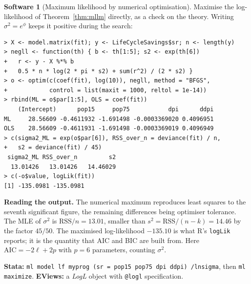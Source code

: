 \documentclass[11pt,a4paper]{article}
\numberwithin{equation}{section}
\theoremstyle{definition}
\newtheorem{software}[thm]{Software}
\begin{document}
\begin{software}[Maximum likelihood by numerical optimisation]
\label{sw:optim}
Maximise the log-likelihood of Theorem~\ref{thm:mllm} directly, as a check on the theory. Writing $\sigma^2 = e^{\phi}$ keeps it positive during the search:
{\small\begin{verbatim}
> X <- model.matrix(fit); y <- LifeCycleSavings$sr; n <- length(y)
> negll <- function(th) { b <- th[1:5]; s2 <- exp(th[6])
+   r <- y - X %*% b
+   0.5 * n * log(2 * pi * s2) + sum(r^2) / (2 * s2) }
> o <- optim(c(coef(fit), log(10)), negll, method = "BFGS",
+            control = list(maxit = 1000, reltol = 1e-14))
> rbind(ML = o$par[1:5], OLS = coef(fit))
    (Intercept)      pop15     pop75           dpi      ddpi
ML     28.56609 -0.4611932 -1.691498 -0.0003369020 0.4096951
OLS    28.56609 -0.4611931 -1.691498 -0.0003369019 0.4096949
> c(sigma2_ML = exp(o$par[6]), RSS_over_n = deviance(fit) / n,
+   s2 = deviance(fit) / 45)
 sigma2_ML RSS_over_n         s2
  13.01426   13.01426   14.46029
> c(-o$value, logLik(fit))
[1] -135.0981 -135.0981
\end{verbatim}}
\textbf{Reading the output.} The numerical maximum reproduces least squares to the seventh significant figure, the remaining differences being
optimiser tolerance. The MLE of $\sigma^2$ is $\text{RSS}/n = 13.01$, smaller than $s^2 = \text{RSS}/(n - k) = 14.46$ by the factor $45/50$. The maximised
log-likelihood $-135.10$ is what R's \texttt{logLik} reports; it is the quantity that AIC and BIC are built from. Here $\text{AIC} = -2\ell + 2p$ with
$p = 6$ parameters, counting $\sigma^2$.

\textbf{Stata:} \texttt{ml model lf myprog (sr = pop15 pop75 dpi ddpi) /lnsigma}, then \texttt{ml maximize}. \textbf{EViews:} a \emph{LogL}
object with \texttt{@logl} specification.
\end{software}
\end{document}
